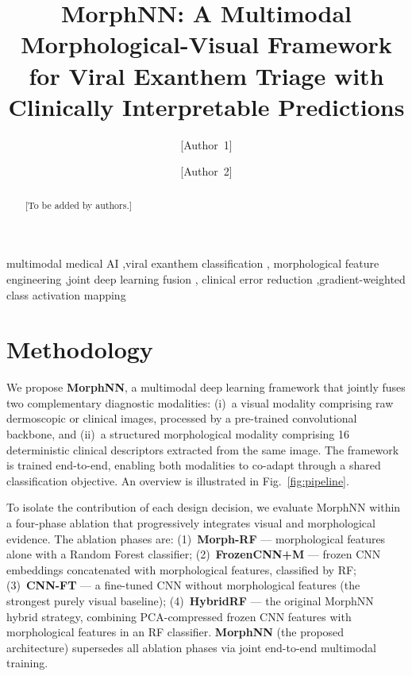 \documentclass[preprint,12pt]{elsarticle}
\begin{document}
\begin{frontmatter}

\title{MorphNN: A Multimodal Morphological-Visual Framework for
       Viral Exanthem Triage with Clinically Interpretable Predictions}

\author[1]{[Author~1]}
\author[1]{[Author~2]}
\address[1]{[Department, University, City, Country]}

\begin{abstract}
[To be added by authors.]
\end{abstract}

\begin{keyword}
multimodal medical AI \sep viral exanthem classification \sep
morphological feature engineering \sep joint deep learning fusion \sep
clinical error reduction \sep gradient-weighted class activation mapping
\end{keyword}

\end{frontmatter}

\linenumbers



\section{Methodology}
\label{sec:methodology}

We propose \textbf{MorphNN}, a multimodal deep learning framework that
jointly fuses two complementary diagnostic modalities: (i)~a visual
modality comprising raw dermoscopic or clinical images, processed by a
pre-trained convolutional backbone, and (ii)~a structured morphological
modality comprising 16 deterministic clinical descriptors extracted from
the same image.  The framework is trained end-to-end, enabling both
modalities to co-adapt through a shared classification objective.  An
overview is illustrated in Fig.~\ref{fig:pipeline}.

To isolate the contribution of each design decision, we evaluate
MorphNN within a four-phase ablation that progressively integrates
visual and morphological evidence.  The ablation phases are: (1)~\textbf{Morph-RF}
--- morphological features alone with a Random Forest classifier;
(2)~\textbf{FrozenCNN+M} --- frozen CNN embeddings concatenated with morphological
features, classified by RF; (3)~\textbf{CNN-FT} --- a fine-tuned CNN
without morphological features (the strongest purely visual baseline);
(4)~\textbf{HybridRF} --- the original MorphNN hybrid strategy, combining
PCA-compressed frozen CNN features with morphological features in an RF
classifier.  \textbf{MorphNN} (the proposed architecture) supersedes all
ablation phases via joint end-to-end multimodal training.
\end{document}
